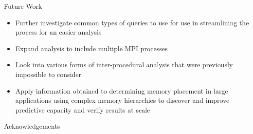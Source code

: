 \documentclass[final]{beamer}
\let\olditem\item
\renewcommand{\item}{\vspace{\fill}\olditem}
\begin{document}
\begin{frame}{\hspace{0.02\paperwidth}Future Work}
\begin{itemize}
\item Further investigate common types of queries to use for use in streamlining the process for an easier analysis
\item Expand analysis to include multiple \acs{MPI} processes
\item Look into various forms of inter-procedural analysis that were previously impossible to consider
\item Apply information obtained to determining memory placement in large applications using complex memory hierarchies to discover and improve predictive capacity and verify results at scale
\end{itemize}
\end{frame}

\begin{frame}{\hspace{0.02\paperwidth}Acknowledgements}
\begin{center}


\end{center}
\end{frame}

\end{document}
